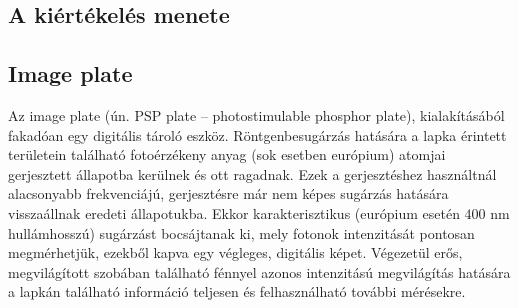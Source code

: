 \begin{multicols}{2}
\section{A kiértékelés menete}
\subsection{Image plate}
Az image plate (ún. PSP plate -- photostimulable phosphor plate), kialakításából fakadóan egy digitális tároló eszköz. Röntgenbesugárzás hatására a lapka érintett területein található fotoérzékeny anyag (sok esetben európium) atomjai gerjesztett állapotba kerülnek és ott ragadnak. Ezek a gerjesztéshez használtnál alacsonyabb frekvenciájú, gerjesztésre már nem képes sugárzás hatására visszaállnak eredeti állapotukba. Ekkor karakterisztikus (európium esetén $400$ nm hullámhosszú) sugárzást bocsájtanak ki, mely fotonok intenzitását pontosan megmérhetjük, ezekből kapva egy végleges, digitális képet. Végezetül erős, megvilágított szobában található fénnyel azonos intenzitású megvilágítás hatására a lapkán található információ teljesen  és felhasználható további mérésekre.


\end{multicols}
